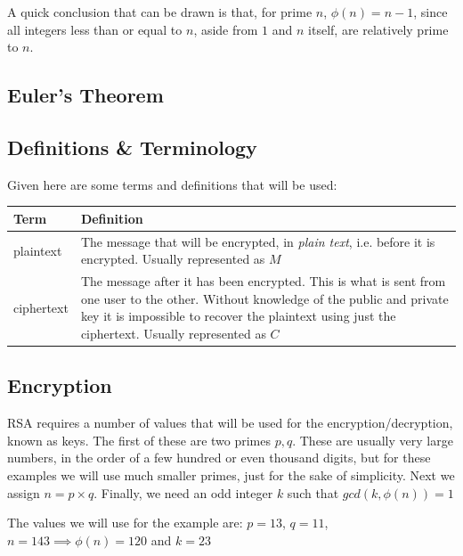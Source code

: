 \documentclass[12pt, titlepage]{article}
\begin{document}
    A quick conclusion that can be drawn is that, for prime $n$, $\phi(n) = n - 1$, since
    all integers less than or equal to $n$, aside from $1$ and $n$ itself, are relatively
    prime to $n$.

    \subsection{Euler's Theorem}
    
    \subsection{Definitions \& Terminology}
    Given here are some terms and definitions that will be used:
    \begin{table}[H]
        \begin{tabular}{ | m{5em} | p{30em} | }
            \hline
            Term      & Definition\\
            \hline
            plaintext & The message that will be encrypted, in \emph{plain
                        text}, i.e. before it is encrypted. Usually represented as $M$\\
            \hline
            ciphertext & The message after it has been encrypted. This is what
                         is sent from one user to the other. Without
                         knowledge of the public and private key it is
                         impossible to recover the plaintext using just the
                         ciphertext. Usually represented as $C$\\
            \hline
        \end{tabular}
    \end{table}
    \subsection{Encryption}
    RSA requires a number of values that will be used for the encryption/decryption, known
    as keys.  The first of these are two primes $p,q$. These are usually very large numbers,
    in the order of a few hundred or even thousand digits, but for these examples we will
    use much smaller primes, just for the sake of simplicity. Next we assign $n=p \times q$.
    Finally, we need an odd integer $k$ such that $gcd(k, \phi (n)) = 1$ 

    The values we will use for the example are: $p=13$, $q=11$, $n=143 \implies \phi (n) =
    120$ and $k = 23$
\end{document}
